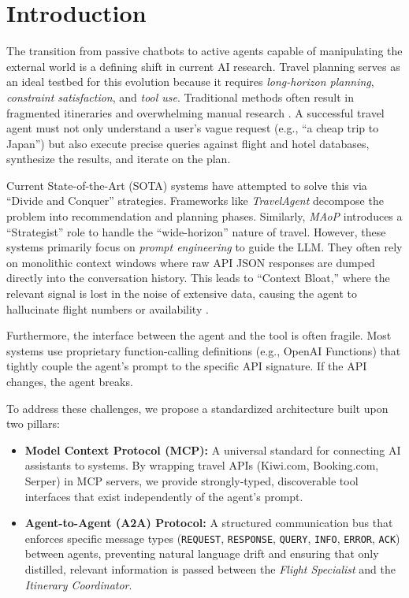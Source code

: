 \documentclass[conference]{IEEEtran}
\begin{document}
\section{Introduction}

The transition from passive chatbots to active agents capable of manipulating the external world is a defining shift in current AI research. Travel planning serves as an ideal testbed for this evolution because it requires \textit{long-horizon planning}, \textit{constraint satisfaction}, and \textit{tool use}. Traditional methods often result in fragmented itineraries and overwhelming manual research \cite{dhote2025smart, anitha2025intelligent}. A successful travel agent must not only understand a user's vague request (e.g., ``a cheap trip to Japan'') but also execute precise queries against flight and hotel databases, synthesize the results, and iterate on the plan.

Current State-of-the-Art (SOTA) systems have attempted to solve this via ``Divide and Conquer'' strategies. Frameworks like \textit{TravelAgent} \cite{chen2024travelagent} decompose the problem into recommendation and planning phases. Similarly, \textit{MAoP} \cite{yang2025planyourtravel} introduces a ``Strategist'' role to handle the ``wide-horizon'' nature of travel. However, these systems primarily focus on \textit{prompt engineering} to guide the LLM. They often rely on monolithic context windows where raw API JSON responses are dumped directly into the conversation history. This leads to ``Context Bloat,'' where the relevant signal is lost in the noise of extensive data, causing the agent to hallucinate flight numbers or availability \cite{shen2025triptailor}.

Furthermore, the interface between the agent and the tool is often fragile. Most systems use proprietary function-calling definitions (e.g., OpenAI Functions) that tightly couple the agent's prompt to the specific API signature. If the API changes, the agent breaks.

To address these challenges, we propose a standardized architecture built upon two pillars:
\begin{itemize}
    \item \textbf{Model Context Protocol (MCP):} A universal standard for connecting AI assistants to systems. By wrapping travel APIs (Kiwi.com, Booking.com, Serper) in MCP servers, we provide strongly-typed, discoverable tool interfaces that exist independently of the agent's prompt.
    \item \textbf{Agent-to-Agent (A2A) Protocol:} A structured communication bus that enforces specific message types (\texttt{REQUEST}, \texttt{RESPONSE}, \texttt{QUERY}, \texttt{INFO}, \texttt{ERROR}, \texttt{ACK}) between agents, preventing natural language drift and ensuring that only distilled, relevant information is passed between the \textit{Flight Specialist} and the \textit{Itinerary Coordinator}.
\end{itemize}
\end{document}
